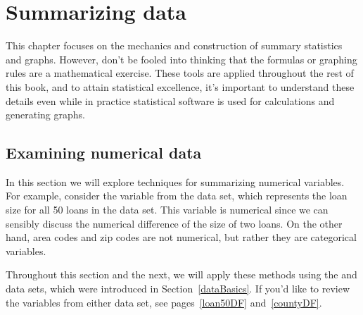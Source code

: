 \chapter{Summarizing data}
\label{summarizingData}
\label{ch_summarizing_data}
\renewcommand{\chapterfolder}{ch_summarizing_data}

This chapter focuses on the mechanics and construction
of summary statistics and graphs.
However, don't be fooled into thinking that the formulas
or graphing rules are a mathematical exercise.
These tools are applied throughout the rest of this book,
and to attain statistical excellence,
it's important to understand these details
even while in practice statistical software is used
for calculations and generating graphs.


\section{Examining numerical data}
\label{numericalData}

\newcommand{\loanA}{10.90}
\newcommand{\loanB}{9.92}
\newcommand{\loanC}{26.30}
\newcommand{\loanD}{9.92}
\newcommand{\loanY}{9.43}
\newcommand{\loanZ}{6.08}
\newcommand{\loanAvg}{11.57}
\newcommand{\loanVar}{25.52}
\newcommand{\loanSD}{5.05}
\newcommand{\loanN}{50}
\newcommand{\loanMedianBelow}{9.93\%}
\newcommand{\loanMedianAbove}{9.93\%}
\newcommand{\loanMedian}{9.93\%}
\newcommand{\loanQA}{7.96}
\newcommand{\loanQC}{13.72}
\newcommand{\loanIQR}{5.76}
\newcommand{\loanAdev}{-0.67}
\newcommand{\loanBdev}{-1.65}
\newcommand{\loanCdev}{14.73}
\newcommand{\loanDdev}{-1.65}
\newcommand{\loanYdev}{-2.14}
\newcommand{\loanZdev}{-5.49}
\newcommand{\loanSmallestValue}{5.31}
\newcommand{\loanLargestValue}{26.30}


In this section we will explore techniques for
summarizing numerical variables.
For example, consider the  variable
from the  data set, which represents the loan
size for all 50 loans in the data set.
This variable is numerical since we can sensibly discuss
the numerical difference of the size of two loans.
On the other hand, area codes and zip codes are not numerical,
but rather they are categorical variables.

Throughout this section and the next, we will apply these
methods using the  and  data sets,
which were introduced in Section~\ref{dataBasics}.
If you'd like to review the variables from either data set,
see pages~\ref{loan50DF} and~\ref{countyDF}.


